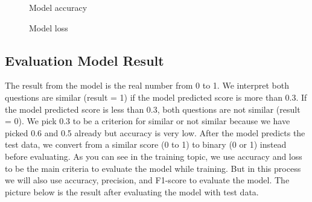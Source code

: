 \documentclass[12pt,oneside,openright,a4paper]{cpe-english-project}
\begin{document}
\begin{figure}[!h]\centering
\setlength{\fboxrule}{0.2mm} %
\setlength{\fboxsep}{1cm}
\caption{Model accuracy}\label{fig:Model accuracy}
\end{figure}
\begin{figure}[!h]\centering
\setlength{\fboxrule}{0.2mm} %
\setlength{\fboxsep}{1cm}
\caption{Model loss}\label{fig:Model loss}
\end{figure}

\subsection{Evaluation Model Result}
The result from the model is the real number from 0 to 1. We interpret both questions are similar (result = 1) if the model predicted score is more than 0.3. If the model predicted score is less than 0.3, both questions are not similar (result = 0). We pick 0.3 to be a criterion for similar or not similar because we have picked 0.6 and 0.5 already but accuracy is very low. After the model predicts the test data, we convert from a similar score (0 to 1)  to binary (0 or 1) instead before evaluating. As you can see in the training topic, we use accuracy and loss to be the main criteria to evaluate the model while training. But in this process we will also use accuracy, precision, and F1-score to evaluate the model. The picture below is the result after evaluating the model with test data.
\end{document}
